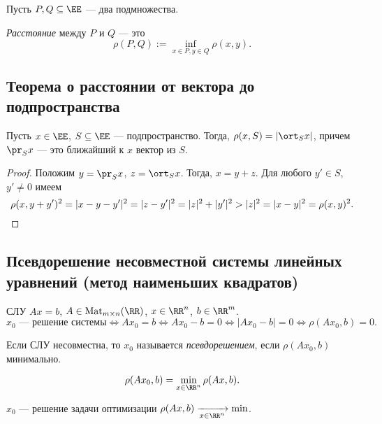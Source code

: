 Пусть $P, Q \subseteq \EE$ --- два подмножества.

\begin{definition}
    \textit{Расстояние} между $P$ и $Q$ --- это
    \begin{equation*}
        \rho(P, Q) := \inf_{x \in P, y \in Q} \rho(x, y)
    .\end{equation*}
\end{definition}


\subsection{Теорема о расстоянии от вектора до подпространства}

\begin{theorem}
    Пусть $x \in \EE$, $S \subseteq \EE$ --- подпространство. Тогда, $\rho(x, S) = \left|\ort_S x\right|$, причем $\pr_S x$ --- это ближайший к $x$ вектор из $S$.
\end{theorem}

\begin{proof}
    Положим $y = \pr_S x$, $z = \ort_S x$. Тогда, $x = y + z$.
    Для любого $y' \in S$, $y' \neq 0$ имеем
    \begin{equation*}
        \rho(x, y + y')^2 = |x - y - y'|^2 = |z - y'|^2 = |z|^2 + |y'|^2 > |z|^2 = |x - y|^2 = \rho(x, y)^2
    .\qedhere\end{equation*}
\end{proof}


\subsection{Псевдорешение несовместной системы линейных уравнений (метод наименьших квадратов)}

СЛУ $Ax = b$, $A \in \text{Mat}_{m \times n}(\RR)$, $x \in \RR^n$, $b \in \RR^m$.
\begin{equation*}
    x_0 \text{ --- решение системы} \iff Ax_0 = b \iff Ax_0 - b = 0 \iff |Ax_0 - b| = 0 \iff \rho(Ax_0, b) = 0
.\end{equation*}

Если СЛУ несовместна, то $x_0$ называется \textit{псевдорешением}, если $\rho(Ax_0, b)$ минимально.

\begin{equation*}
    \rho(Ax_0, b) = \min_{x \in \RR^n} \rho(Ax, b)
.\end{equation*}

$x_0$ --- решение задачи оптимизации $\rho(Ax, b) \xrightarrow[x \in \RR^n]{} \min$.
